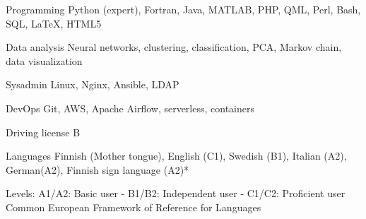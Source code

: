 

\begin{cvskills}

  \cvskill
    {Programming} %
    {Python (expert), Fortran, Java, MATLAB, PHP, QML, Perl, Bash, SQL, \LaTeX, HTML5} %
    
%    
  \cvskill
    {Data analysis} %
    {Neural networks, clustering, classification, PCA, Markov chain, data visualization} %

  \cvskill
    {Sysadmin} %
    {Linux, Nginx, Ansible, LDAP} %
    
  \cvskill
    {DevOps} %
    {Git, AWS, Apache Airflow, serverless, containers} %
    
    
  \cvskill
    {Driving license} %
    {B} %

  \cvskill
    {Languages} %
    {Finnish (Mother tongue), English (C1), Swedish (B1), Italian (A2), German(A2), Finnish sign language (A2)*} %

\end{cvskills}

\begin{flushright}
{\tiny *Levels: A1/A2: Basic user - B1/B2: Independent user - C1/C2: Proficient user\\[-6pt]
Common European Framework of Reference for Languages}
\end{flushright}


